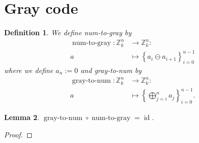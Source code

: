 \documentclass[10pt,a4paper,BCOR = 12mm,DIV=15]{scrbook}
\newtheorem{Def}{Definition}
\newtheorem{Le}[Def]{Lemma}
\newcommand{\id}{\operatorname{id}}
\newcommand{\numgray}{\operatorname{num-to-gray}}
\newcommand{\graynum}{\operatorname{gray-to-num}}
\begin{document}
\section{Gray code}

\begin{Def}
We define \emph{num-to-gray} by
\begin{align*}
\numgray: \mathbb{Z}_k^n & \rightarrow \mathbb{Z}_k^n: \\
a & \mapsto \left\{
a_i \ominus a_{i+1} 
\right\}_{i=0}^{n-1}
\end{align*}
where we define $a_n := 0$ and \emph{gray-to-num} by
\begin{align*}
\graynum: \mathbb{Z}_k^n & \rightarrow \mathbb{Z}_k^n: \\
a & \mapsto \left\{
\bigoplus_{j=i}^n a_j
\right\}_{i=0}^{n-1}.
\end{align*}
\end{Def}

\begin{Le}
$\graynum \circ \numgray = \id$.
\end{Le}
\begin{proof}
\end{proof}
\end{document}
